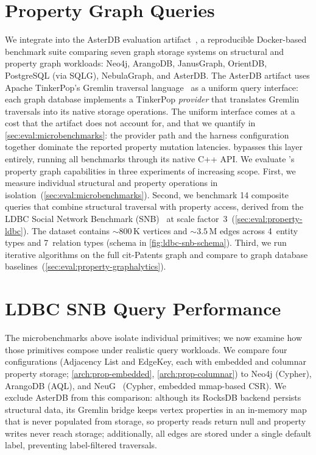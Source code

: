 \section{Property Graph Queries}
\label{sec:eval:property}

We integrate \project{} into the AsterDB evaluation artifact~\cite{moAsterEnhancingLSMstructures2025}, a reproducible Docker-based benchmark suite comparing seven graph storage systems on structural and property graph workloads: Neo4j, ArangoDB, JanusGraph, OrientDB, PostgreSQL (via SQLG), NebulaGraph, and AsterDB.
The AsterDB artifact uses Apache TinkerPop's Gremlin traversal language~\cite{apachetinkerpop} as a uniform query interface: each graph database implements a TinkerPop \emph{provider} that translates Gremlin traversals into its native storage operations.
The uniform interface comes at a cost that the artifact does not account for, and that we quantify in \autoref{sec:eval:microbenchmarks}: the provider path and the harness configuration together dominate the reported property mutation latencies.
\project{} bypasses this layer entirely, running all benchmarks through its native C++ API.
We evaluate \project{}'s property graph capabilities in three experiments of increasing scope.
First, we measure individual structural and property operations in isolation~(\autoref{sec:eval:microbenchmarks}).
Second, we benchmark 14 composite queries that combine structural traversal with property access, derived from the LDBC Social Network Benchmark (SNB)~\cite{erling2015ldbc} at scale factor~3~(\autoref{sec:eval:property-ldbc}).
The dataset contains ${\sim}800$\,K vertices and ${\sim}3.5$\,M edges across 4~entity types and 7~relation types (schema in \autoref{fig:ldbc-snb-schema}).
Third, we run iterative algorithms on the full cit-Patents graph and compare \project{} to graph database baselines~(\autoref{sec:eval:property-graphalytics}).



\section{LDBC SNB Query Performance}
\label{sec:eval:property-ldbc}

The microbenchmarks above isolate individual primitives; we now examine how those primitives compose under realistic query workloads.
We compare four \project{} configurations (Adjacency List and EdgeKey, each with embedded and columnar property storage; \autoref{arch:prop-embedded}, \autoref{arch:prop-columnar}) to Neo4j (Cypher), ArangoDB (AQL), and NeuG~\cite{NeuG2025Alibaba} (Cypher, embedded mmap-based CSR).
We exclude AsterDB from this comparison: although its RocksDB backend persists structural data, its Gremlin bridge keeps vertex properties in an in-memory map that is never populated from storage, so property reads return null and property writes never reach storage; additionally, all edges are stored under a single default label, preventing label-filtered traversals.

